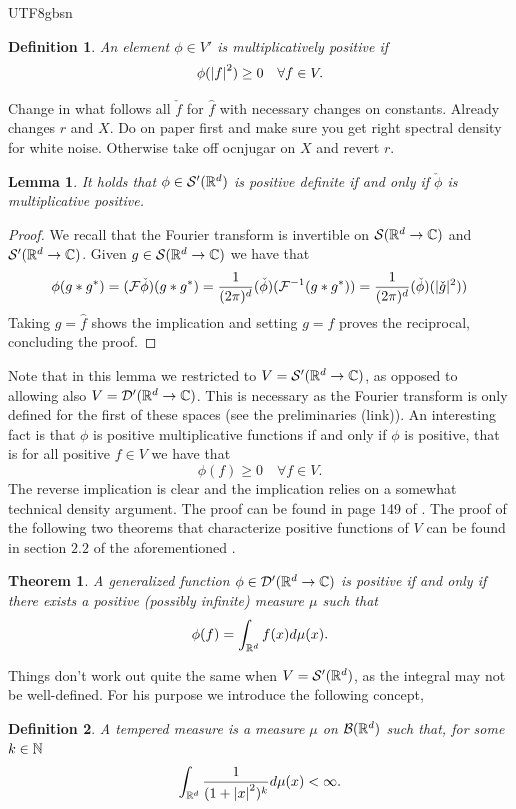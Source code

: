 \documentclass[12pt]{article}
\newtheorem{theorem}{Theorem}
\newtheorem{lemma}{Lemma}
\newtheorem{definition}{Definition}
\newcommand{\red}[1]{{\color{red}#1}}
\begin{document}
\begin{CJK*}{UTF8}{gbsn}
	\begin{definition}
		An element $\phi\in V'$ is \emph{multiplicatively positive} if
		\begin{equation*}
			\phi(\abs{f}^2)\geq 0\quad\forall f\in V.
		\end{equation*}
	\end{definition}
	\red{Change in what follows all $\check{f}$ for  $\hat{f}$ with necessary changes on constants. Already changes $r$ and  $X$. Do on paper first and make sure you get right spectral density for white noise. Otherwise take off ocnjugar on $X$ and revert  $r$.}
	\begin{lemma}
		It holds that $\phi\in {\mathcal S}'({\mathbb R}^d)$ is positive definite if and only if $\check{\phi}$ is multiplicative positive.
	\end{lemma}
	\begin{proof}
		We recall that the Fourier transform is invertible on ${\mathcal S}({\mathbb R}^d\to\mathbb{C})$ and ${\mathcal S}'({\mathbb R}^d\to\mathbb{C})$. Given $g\in {\mathcal S}({\mathbb R}^d\to\mathbb{C})$ we have that
		\begin{equation*}
			\phi(g*g^*)=(\mathcal{F}\check{\phi})(g*g^*)=\frac{1}{(2\pi)^d}(\check{\phi})(\mathcal{F}^{-1}(g*g^*))=\frac{1}{(2\pi)^{d}}(\check{\phi})(|\check{g}|^2))
		\end{equation*}
		Taking $g=\hat{f}$ shows the implication and setting $g=f$ proves the reciprocal, concluding the proof.
	\end{proof}
	Note that in this lemma we restricted to $V={\mathcal S}'({\mathbb R}^d\to\mathbb{C})$, as opposed to allowing also $V=\mathcal{D}'({\mathbb R}^d\to\mathbb{C})$. This is necessary as the Fourier transform is only defined for the first of these spaces (see the preliminaries (link)).
	An interesting fact is that $\phi$ is positive multiplicative functions if and only if $\phi$ is positive, that is for all positive $f \in V$ we have that
	\begin{equation*}
		\phi(f)\geq 0\quad\forall f\in V.
	\end{equation*}
	The reverse implication is clear and the implication relies on a somewhat technical density argument. The proof can be found in page 149 of \cite{gel2016generalized}. The proof of the following two theorems that characterize positive functions of $V$ can be found in section  $2.2$ of the aforementioned \cite{gel2016generalized}.
	\begin{theorem}\label{positivegives measure}
		A generalized function $\phi\in \mathcal{D}'({\mathbb R}^d\to\mathbb{C})$ is positive if and only if there exists a positive (possibly infinite) measure $\mu $ such that
		\begin{equation*}
			\phi(f)=\int_{{\mathbb R}^d} f(x)d\mu(x).
		\end{equation*}
	\end{theorem}
	Things don't work out quite the same when $V={\mathcal S}'({\mathbb R}^d)$, as the integral may not be well-defined. For his purpose we introduce the following concept,
	\begin{definition}
		A tempered measure is a measure $\mu$ on $\mathcal{B}({\mathbb R}^d)$ such that, for some $k\in \mathbb{N}$
		\begin{equation*}
			\int_{{\mathbb R}^d} \frac{1}{(1+\abs{x}^2)^k}d \mu (x)<\infty .
		\end{equation*}


\end{definition}
\end{CJK*}
\end{document}
